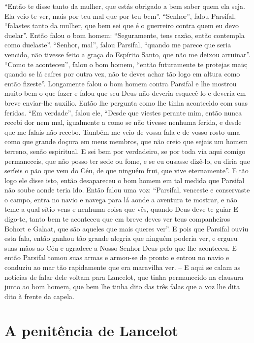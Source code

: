 “Então te disse tanto da mulher, que estás obrigado a bem saber quem ela
seja. Ela veio te ver, mais por teu mal que por teu bem”. “Senhor”, falou
Parsifal, “falastes tanto da mulher, que bem sei que é o guerreiro contra quem
eu devo duelar”. Então falou o bom homem: “Seguramente, tens razão, então
contempla como duelaste”. “Senhor, mal”, falou Parsifal, “quando me parece que
seria vencido, não tivesse feito a graça do Espírito Santo, que não me deixou
arruinar”. “Como te aconteceu”, falou o bom homem, “então futuramente te
protejas mais; quando se lá caíres por outra vez, não te deves achar tão logo
em altura como então fizeste”. Longamente falou o bom homem contra Parsifal e
lhe mostrou muito bem o que fazer e falou que seu Deus não deveria esquecê-lo e
deveria em breve enviar-lhe auxílio. Então lhe pergunta como lhe tinha
acontecido com suas feridas. “Em verdade”, falou ele, “Desde que viestes
perante mim, então nunca recebi dor nem mal, igualmente a como se não tivesse
nenhuma ferida, e desde que me falais não recebo. Também me veio de vossa fala
e de vosso rosto uma como que grande doçura em meus membros, que não creio que
sejais um homem terreno, senão espiritual. E sei bem por verdadeiro, se por
toda via aqui comigo permaneceis, que não posso ter sede ou fome, e se eu
ousasse dizê-lo, eu diria que seríeis o pão que vem do Céu, de que ninguém
frui, que vive eternamente”. E tão logo ele disse isto, então desapareceu o bom
homem em tal medida que Parsifal não soube aonde teria ido. Então falou uma
voz: “Parsifal, venceste e conservaste o campo, entra no navio e navega para
lá aonde a aventura te mostrar, e não teme a qual sítio vens e nenhuma coisa
que vês, quando Deus deve te guiar E digo-te, tanto bem te aconteceu que em
breve deves ver teus companheiros Bohort e Galaat, que são aqueles que mais
queres ver”. E pois que Parsifal ouviu esta fala, então
ganhou tão grande alegria que ninguém poderia ver, e ergueu suas mãos ao Céu e
agradece a Nosso Senhor Deus pelo que lhe aconteceu. E então Parsifal tomou
suas armas e armou-se de pronto e entrou no navio e conduziu ao mar tão
rapidamente que era maravilha ver. – E aqui se calam as notícias de falar dele
voltam para Lancelot, que tinha permanecido na clausura junto ao bom homem,
que bem lhe tinha dito das três falas que a voz lhe dita dito à frente da
capela. 

\chapter{A penitência de Lancelot}

